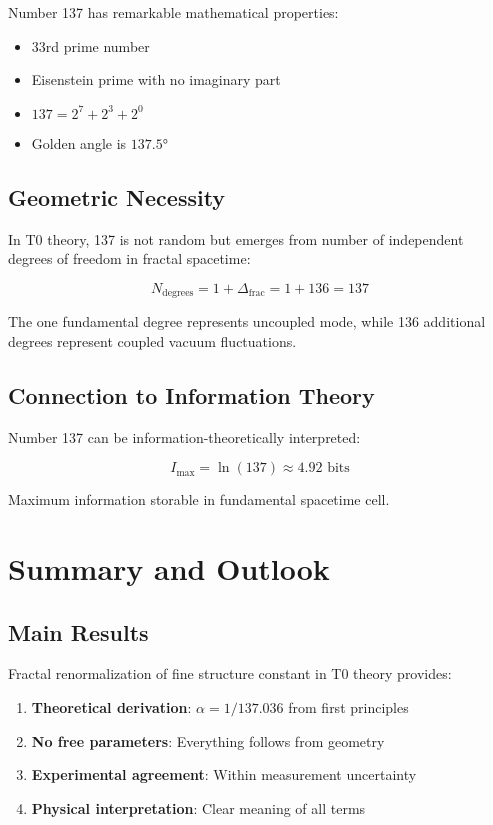 \documentclass[12pt,a4paper]{article}
\theoremstyle{definition}
\begin{document}
	Number 137 has remarkable mathematical properties:
	
	\begin{itemize}
		\item 33rd prime number
		\item Eisenstein prime with no imaginary part
		\item $137 = 2^7 + 2^3 + 2^0$
		\item Golden angle is $137.5°$
	\end{itemize}
	
	\subsection{Geometric Necessity}
	
	In T0 theory, 137 is not random but emerges from number of independent degrees of freedom in fractal spacetime:
	
	\begin{equation}
		N_{\text{degrees}} = 1 + \Delta_{\text{frac}} = 1 + 136 = 137
	\end{equation}
	
	The one fundamental degree represents uncoupled mode, while 136 additional degrees represent coupled vacuum fluctuations.
	
	\subsection{Connection to Information Theory}
	
	Number 137 can be information-theoretically interpreted:
	
	\begin{equation}
		I_{\text{max}} = \ln(137) \approx 4.92 \text{ bits}
	\end{equation}
	
	Maximum information storable in fundamental spacetime cell.
	
	\section{Summary and Outlook}
	
	\subsection{Main Results}
	
	Fractal renormalization of fine structure constant in T0 theory provides:
	
	\begin{enumerate}
		\item \textbf{Theoretical derivation}: $\alpha = 1/137.036$ from first principles
		\item \textbf{No free parameters}: Everything follows from geometry
		\item \textbf{Experimental agreement}: Within measurement uncertainty
		\item \textbf{Physical interpretation}: Clear meaning of all terms
	\end{enumerate}
	
\end{document}
